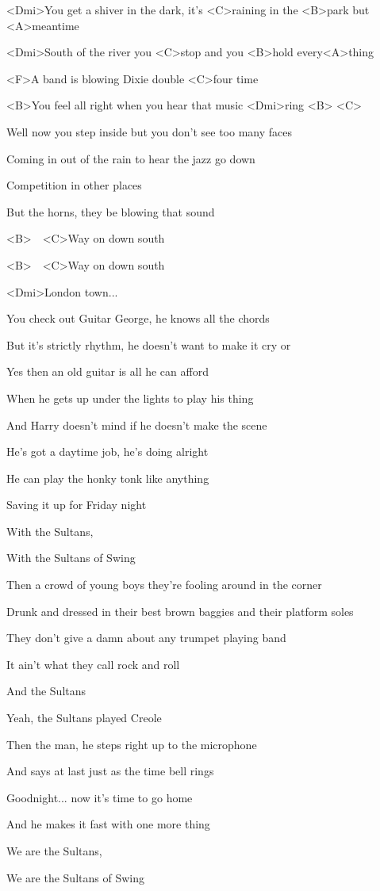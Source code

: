 

\zs
<Dmi>You get a shiver in the dark, it's <C>raining in the <B>park but <A>meantime

<Dmi>South of the river you <C>stop and you <B>hold every<A>thing

<F>A band is blowing Dixie double <C>four time

<B>You feel all right when you hear that music <Dmi>ring <B> <C>
\ks

\zs
Well now you step inside but you don't see too many faces

Coming in out of the rain to hear the jazz go down

Competition in other places

But the horns, they be blowing that sound
\ks

\zr
<B>~~<C>Way on down south

<B>~~<C>Way on down south

<Dmi>London town...
\kr

\zs
You check out Guitar George, he knows all the chords

But it's strictly rhythm, he doesn't want to make it cry or

Yes then an old guitar is all he can afford

When he gets up under the lights to play his thing
\ks

\zs
And Harry doesn't mind if he doesn't make the scene

He's got a daytime job, he's doing alright

He can play the honky tonk like anything

Saving it up for Friday night
\ks

\zr
With the Sultans,

With the Sultans of Swing
\kr

\zs
Then a crowd of young boys they're fooling around in the corner

Drunk and dressed in their best brown baggies and their platform soles

They don't give a damn about any trumpet playing band

It ain't what they call rock and roll
\ks

\zr
And the Sultans

Yeah, the Sultans played Creole
\kr

\zs
Then the man, he steps right up to the microphone

And says at last just as the time bell rings

Goodnight... now it's time to go home

And he makes it fast with one more thing
\ks

\zr
We are the Sultans,

We are the Sultans of Swing
\kr

\kp
